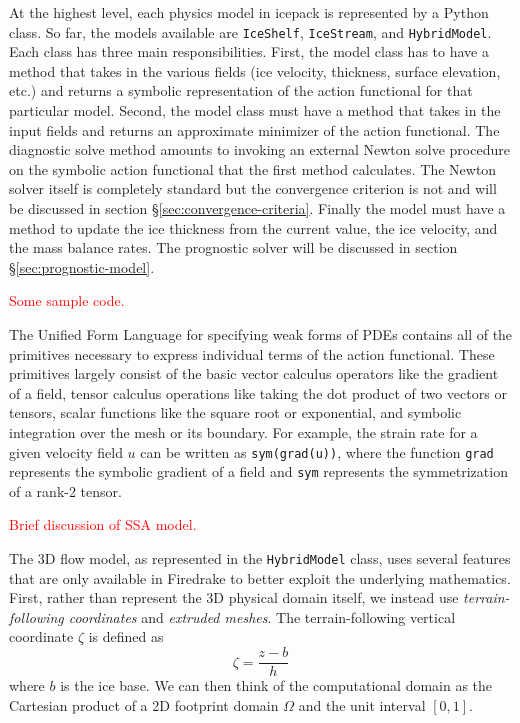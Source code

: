 \documentclass{article}
\theoremstyle{definition}
\theoremstyle{plain}
\begin{document}
At the highest level, each physics model in icepack is represented by a Python class.
So far, the models available are \texttt{IceShelf}, \texttt{IceStream}, and \texttt{HybridModel}.
Each class has three main responsibilities.
First, the model class has to have a method that takes in the various fields (ice velocity, thickness, surface elevation, etc.) and returns a symbolic representation of the action functional for that particular model.
Second, the model class must have a method that takes in the input fields and returns an approximate minimizer of the action functional.
The diagnostic solve method amounts to invoking an external Newton solve procedure on the symbolic action functional that the first method calculates.
The Newton solver itself is completely standard but the convergence criterion is not and will be discussed in section \S\ref{sec:convergence-criteria}.
Finally the model must have a method to update the ice thickness from the current value, the ice velocity, and the mass balance rates.
The prognostic solver will be discussed in section \S\ref{sec:prognostic-model}.

\textcolor{red}{Some sample code.}

The Unified Form Language for specifying weak forms of PDEs contains all of the primitives necessary to express individual terms of the action functional.
These primitives largely consist of the basic vector calculus operators like the gradient of a field, tensor calculus operations like taking the dot product of two vectors or tensors, scalar functions like the square root or exponential, and symbolic integration over the mesh or its boundary.
For example, the strain rate for a given velocity field $u$ can be written as \texttt{sym(grad(u))}, where the function \texttt{grad} represents the symbolic gradient of a field and \texttt{sym} represents the symmetrization of a rank-2 tensor.

\textcolor{red}{Brief discussion of SSA model.}

The 3D flow model, as represented in the \texttt{HybridModel} class, uses several features that are only available in Firedrake to better exploit the underlying mathematics.
First, rather than represent the 3D physical domain itself, we instead use \emph{terrain-following coordinates} and \emph{extruded meshes}.
The terrain-following vertical coordinate $\zeta$ is defined as
\begin{equation}
    \zeta = \frac{z - b}{h}
\end{equation}
where $b$ is the ice base.
We can then think of the computational domain as the Cartesian product of a 2D footprint domain $\Omega$ and the unit interval $[0, 1]$.
\end{document}
